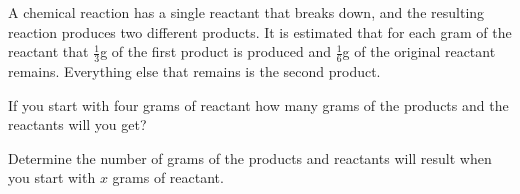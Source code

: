 
\begin{problem}
\item A chemical reaction has a single reactant that breaks down, 
  and the resulting reaction produces two different
  products. It is estimated that for each gram of the reactant that
  $\frac{1}{3}$g of the first product is produced and $\frac{1}{6}$g
  of the original reactant remains. Everything else that remains is
  the second product.
  \begin{subproblem}
  \item If you start with four grams of reactant how many grams of the
    products and the reactants will you get?
    \vfill
  \item Determine the number of grams of the products and reactants
    will result when you start with  $x$ grams of reactant.
    \vfill
  \end{subproblem}
\end{problem}



